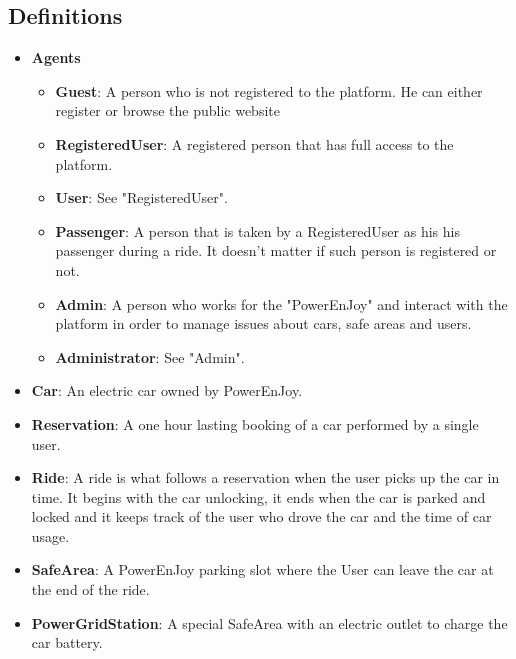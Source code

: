 \subsection{Definitions}
    \begin{itemize}
        \item \textbf{Agents}
        \begin{itemize}
            \item \textbf{Guest}: A person who is not registered to the platform. He can either
                register or browse the public website
            \item \textbf{RegisteredUser}: A registered person that has full access to the platform.
            \item \textbf{User}: See "RegisteredUser".
            \item \textbf{Passenger}: A person that is taken by a RegisteredUser as his
                his passenger during a ride. It doesn't matter if such person is registered or not.
            \item \textbf{Admin}: A person who works for the "PowerEnJoy" and interact with the platform in order to manage issues about cars, safe areas and users.
            \item \textbf{Administrator}: See "Admin".
        \end{itemize}
        \item \textbf{Car}: An electric car owned by PowerEnJoy.		
        \item \textbf{Reservation}: A one hour lasting booking of a car performed by a 
            single user.
        \item \textbf{Ride}: A ride is what follows a reservation when the user picks up the
            car in time. It begins with the car unlocking, it ends when the car is parked and
            locked and it keeps track of the user who drove the car and the time of car usage.
        \item \textbf{SafeArea}: A PowerEnJoy parking slot where the User can leave the car
            at the end of the ride.
        \item \textbf{PowerGridStation}: A special SafeArea with an electric outlet to charge
            the car battery.
    \end{itemize}
